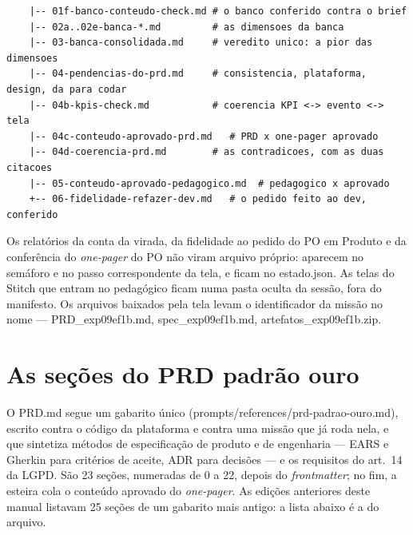 \documentclass[11pt,a4paper]{article}
\newcommand{\cod}[1]{{\ttfamily\small #1}}
\begin{document}
\begin{lstlisting}
    |-- 01f-banco-conteudo-check.md # o banco conferido contra o brief
    |-- 02a..02e-banca-*.md         # as dimensoes da banca
    |-- 03-banca-consolidada.md     # veredito unico: a pior das dimensoes
    |-- 04-pendencias-do-prd.md     # consistencia, plataforma, design, da para codar
    |-- 04b-kpis-check.md           # coerencia KPI <-> evento <-> tela
    |-- 04c-conteudo-aprovado-prd.md   # PRD x one-pager aprovado
    |-- 04d-coerencia-prd.md        # as contradicoes, com as duas citacoes
    |-- 05-conteudo-aprovado-pedagogico.md  # pedagogico x aprovado
    +-- 06-fidelidade-refazer-dev.md   # o pedido feito ao dev, conferido
\end{lstlisting}

Os relatórios da conta da virada, da fidelidade ao pedido do PO em Produto e da conferência do \emph{one-pager} do PO não viram arquivo próprio: aparecem no semáforo e no passo correspondente da tela, e ficam no \cod{estado.json}. As telas do Stitch que entram no pedagógico ficam numa pasta oculta da sessão, fora do manifesto. Os arquivos baixados pela tela levam o identificador da missão no nome --- \cod{PRD\_exp09ef1b.md}, \cod{spec\_exp09ef1b.md}, \cod{artefatos\_exp09ef1b.zip}.

\section{As seções do PRD padrão ouro}
\label{ap:prd}

O \cod{PRD.md} segue um gabarito único (\cod{prompts/references/prd-padrao-ouro.md}), escrito contra o código da plataforma e contra uma missão que já roda nela, e que sintetiza métodos de especificação de produto e de engenharia --- EARS e Gherkin para critérios de aceite, ADR para decisões --- e os requisitos do art.~14 da LGPD. São 23 seções, numeradas de 0 a 22, depois do \emph{frontmatter}; no fim, a esteira cola o conteúdo aprovado do \emph{one-pager}. As edições anteriores deste manual listavam 25 seções de um gabarito mais antigo: a lista abaixo é a do arquivo.
\end{document}
